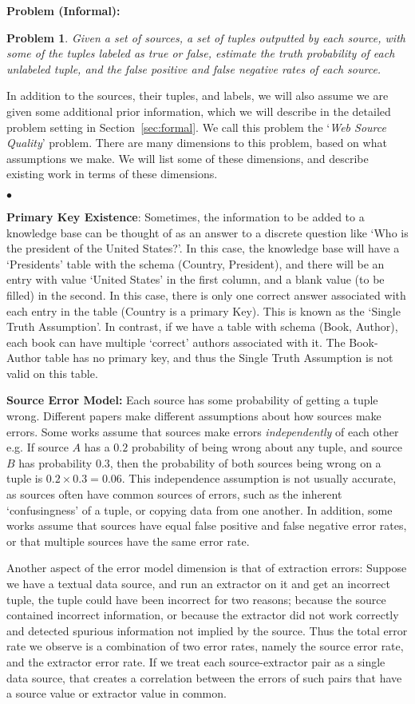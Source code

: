 \documentclass{sig-alternate}
\newcounter{prob}
\newtheorem{problem}[prob]{Problem}
\newcommand{\squishlist}{
   \begin{list}{$\bullet$}
    { \setlength{\itemsep}{0pt}
      \setlength{\parsep}{2pt}
      \setlength{\topsep}{2pt}
      \setlength{\partopsep}{0pt}
    }
}
\newcommand{\stitle}[1]{\vspace{0.5em}\noindent\textbf{#1}}
\newcommand{\squishend}{\end{list}}
\begin{document}
\stitle{Problem (Informal):} 
\begin{problem}\label{prob:high-level}
Given a set of sources, a set of tuples outputted by each source, with some of the tuples labeled as true or false, estimate the truth probability of each unlabeled tuple, and the false positive and false negative rates of each source.
\end{problem}
In addition to the sources, their tuples, and labels, we will also assume we are given some additional prior information, which we will describe in the detailed problem setting in Section~\ref{sec:formal}.
We call this problem the `{\em Web Source Quality}' problem. There are many dimensions to this problem, based on what assumptions we make. We will list some of these dimensions, and describe existing work in terms of these dimensions. 
\squishlist
\item {\bf Primary Key Existence}: Sometimes, the information to be added to a knowledge base can be thought of as an answer to a discrete question like `Who is the president of the United States?'. In this case, the knowledge base will have a `Presidents' table with the schema (Country, President), and there will be an entry with value `United States' in the first column, and a blank value (to be filled) in the second. In this case, there is only one correct answer associated with each entry in the table (Country is a primary Key). This is known as the `Single Truth Assumption'. In contrast, if we have a table with schema (Book, Author), each book can have multiple `correct' authors associated with it. The Book-Author table has no primary key, and thus the Single Truth Assumption is not valid on this table.
\item {\bf Source Error Model:} Each source has some probability of getting a tuple wrong. Different papers make different assumptions about how sources make errors. Some works assume that sources make errors {\em independently} of each other e.g. If source $A$ has a $0.2$ probability of being wrong about any tuple, and source $B$ has probability $0.3$, then the probability of both sources being wrong on a tuple is $0.2 \times 0.3 = 0.06$. This independence assumption is not usually accurate, as sources often have common sources of errors, such as the inherent `confusingness' of a tuple, or copying data from one another. In addition, some works assume that sources have equal false positive and false negative error rates, or that multiple sources have the same error rate. 

Another aspect of the error model dimension is that of extraction errors: Suppose we have a textual data source, and run an extractor on it and get an incorrect tuple, the tuple could have been incorrect for two reasons; because the source contained incorrect information, or because the extractor did not work correctly and detected spurious information not implied by the source. Thus the total error rate we observe is a combination of two error rates, namely the source error rate, and the extractor error rate. If we treat each source-extractor pair as a single data source, that creates a correlation between the errors of such pairs that have a source value or extractor value in common. 
\squishend
\end{document}
